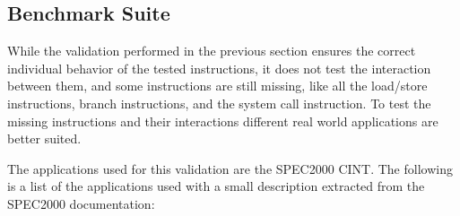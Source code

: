 \subsection{Benchmark Suite}
\label{sec:benchmark_suite}

While the validation performed in the previous section ensures the correct individual behavior of the tested instructions, it does not test the interaction between them, and some instructions are still missing, like all the load/store instructions, branch instructions, and the system call instruction.
To test the missing instructions and their interactions different real world applications are better suited.

The applications used for this validation are the SPEC2000 CINT.
The following is a list of the applications used with a small description extracted from the SPEC2000 documentation:
